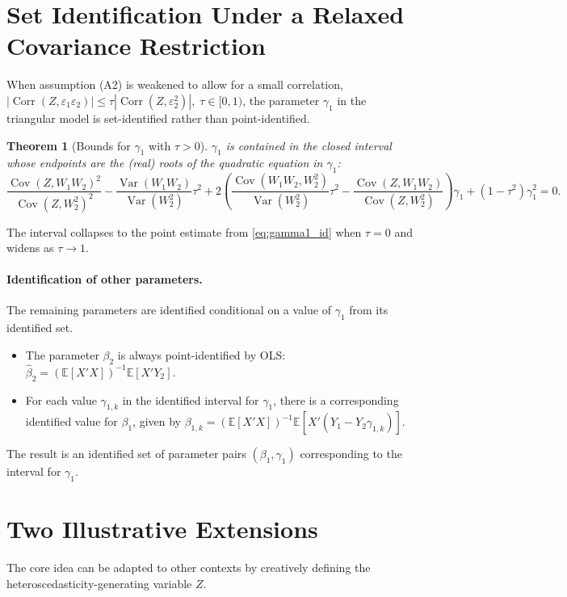 \documentclass{article}
\newcommand{\E}{\mathbb{E}}
\newcommand{\cov}{\operatorname{Cov}}
\newcommand{\corr}{\operatorname{Corr}}
\newcommand{\var}{\operatorname{Var}}
\theoremstyle{plain}
\newtheorem{theorem}{Theorem}
\begin{document}
\section{Set Identification Under a Relaxed Covariance Restriction}

When assumption (A2) is weakened to allow for a small correlation,
\(|\corr(Z,\varepsilon_1\varepsilon_2)|
   \le \tau|\corr(Z,\varepsilon_2^2)|,\; \tau\in[0,1)\),
the parameter \(\gamma_1\) in the triangular model is set-identified rather than point-identified.

\begin{theorem}[Bounds for \(\gamma_1\) with \(\tau>0\)]
\label{thm:bounds}
$\gamma_1$ is contained in the closed interval whose endpoints are the
(real) roots of the quadratic equation in \(\gamma_1\):
\[
\frac{\cov(Z,W_1W_2)^2}{\cov(Z,W_2^2)^2}
-\frac{\var(W_1W_2)}{\var(W_2^2)}\tau^{2}
+2\!\left(
  \frac{\cov(W_1W_2,W_2^{2})}{\var(W_2^{2})}\tau^{2}
  -\frac{\cov(Z,W_1W_2)}{\cov(Z,W_2^{2})}
 \right)\!\gamma_1
 +(1-\tau^{2})\gamma_1^{2}=0.
\]
\end{theorem}
The interval collapses to the point estimate from \eqref{eq:gamma1_id} when \(\tau=0\) and widens as \(\tau \to 1\).

\paragraph{Identification of other parameters.}
The remaining parameters are identified conditional on a value of \(\gamma_1\) from its identified set.
\begin{itemize}\itemsep0pt
    \item The parameter \(\beta_2\) is always point-identified by OLS: \(\hat\beta_2 = (\E[X'X])^{-1}\E[X'Y_2]\).
    \item For each value \(\gamma_{1,k}\) in the identified interval for \(\gamma_1\), there is a corresponding identified value for \(\beta_1\), given by \(\beta_{1,k} = (\E[X'X])^{-1}\E[X'(Y_1 - Y_2\gamma_{1,k})]\).
\end{itemize}
The result is an identified set of parameter pairs \((\beta_1, \gamma_1)\) corresponding to the interval for \(\gamma_1\).

\section{Two Illustrative Extensions}

The core idea can be adapted to other contexts by creatively defining the heteroscedasticity-generating variable \(Z\).
\end{document}
